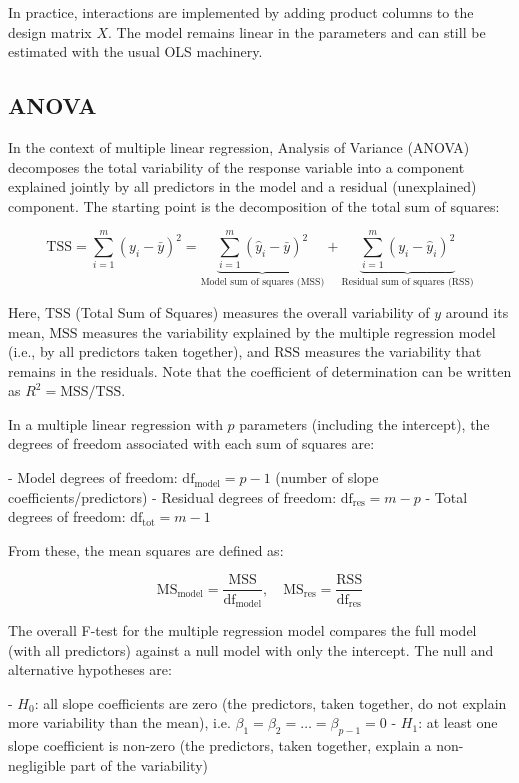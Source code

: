 In practice, interactions are implemented by adding product columns to the design matrix $X$. The model remains linear in the parameters and can still be estimated with the usual OLS machinery.




\subsection{ANOVA}

In the context of multiple linear regression, Analysis of Variance (ANOVA) decomposes the total variability of the response variable into a component explained jointly by all predictors in the model and a residual (unexplained) component. The starting point is the decomposition of the total sum of squares:

\[
\text{TSS} = \sum_{i=1}^{m} (y_i - \bar{y})^2
= \underbrace{\sum_{i=1}^{m} (\hat{y}_i - \bar{y})^2}_{\text{Model sum of squares (MSS)}}
+ \underbrace{\sum_{i=1}^{m} (y_i - \hat{y}_i)^2}_{\text{Residual sum of squares (RSS)}}
\]

Here, $\text{TSS}$ (Total Sum of Squares) measures the overall variability of $y$ around its mean, $\text{MSS}$ measures the variability explained by the multiple regression model (i.e., by all predictors taken together), and $\text{RSS}$ measures the variability that remains in the residuals. Note that the coefficient of determination can be written as $R^2 = \text{MSS} / \text{TSS}$.

In a multiple linear regression with $p$ parameters (including the intercept), the degrees of freedom associated with each sum of squares are:

- Model degrees of freedom: $\text{df}_{\text{model}} = p - 1$ (number of slope coefficients/predictors)
- Residual degrees of freedom: $\text{df}_{\text{res}} = m - p$
- Total degrees of freedom: $\text{df}_{\text{tot}} = m - 1$

From these, the mean squares are defined as:

\[
\text{MS}_{\text{model}} = \frac{\text{MSS}}{\text{df}_{\text{model}}}, \quad
\text{MS}_{\text{res}}   = \frac{\text{RSS}}{\text{df}_{\text{res}}}
\]

The overall F-test for the multiple regression model compares the full model (with all predictors) against a null model with only the intercept. The null and alternative hypotheses are:

- $H_0$: all slope coefficients are zero (the predictors, taken together, do not explain more variability than the mean), i.e. $\beta_1 = \beta_2 = \dots = \beta_{p-1} = 0$
- $H_1$: at least one slope coefficient is non-zero (the predictors, taken together, explain a non-negligible part of the variability)

